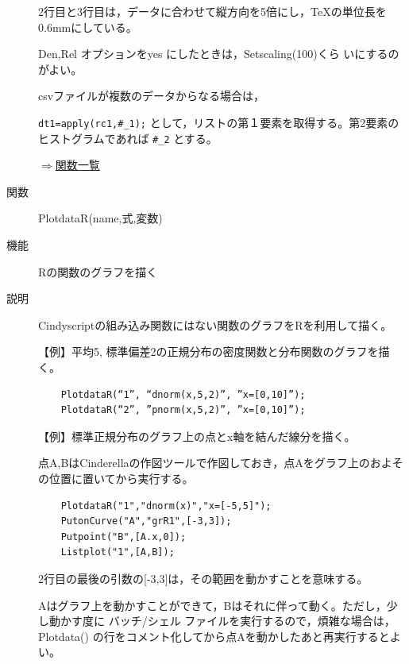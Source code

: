 \documentclass[papersize,a4paper,12pt,uplatex]{jsarticle}
\begin{document}
\begin{description}
2行目と3行目は，データに合わせて縦方向を5倍にし，TeXの単位長を0.6mmにしている。

Den,Rel オプションをyes にしたときは，Setscaling(100)くら  いにするのがよい。

csvファイルが複数のデータからなる場合は，

    \verb|dt1=apply(rc1,#_1);|
として，リストの第１要素を取得する。第2要素のヒストグラムであれば  \verb|#_2| とする。

\vspace{\baselineskip}
\begin{flushright}  \hyperlink{functionlist}{$\Rightarrow$関数一覧}\end{flushright}

\hypertarget{plotdatar}{}
\item[関数]  PlotdataR(name,式,変数)
\item[機能]  Rの関数のグラフを描く
\item[説明]  Cindyscriptの組み込み関数にはない関数のグラフをRを利用して描く。

\vspace{\baselineskip}
【例】平均5, 標準偏差2の正規分布の密度関数と分布関数のグラフを描く。
\begin{verbatim}
    PlotdataR(“1”, “dnorm(x,5,2)”, ”x=[0,10]”);
    PlotdataR(“2”, ”pnorm(x,5,2)”, ”x=[0,10]”);
\end{verbatim}

\hspace{20mm} 

【例】標準正規分布のグラフ上の点とx軸を結んだ線分を描く。

点A,BはCinderellaの作図ツールで作図しておき，点Aをグラフ上のおよその位置に置いてから実行する。
\begin{verbatim}
    PlotdataR("1","dnorm(x)","x=[-5,5]");
    PutonCurve("A","grR1",[-3,3]);
    Putpoint("B",[A.x,0]);
    Listplot("1",[A,B]);
\end{verbatim}
2行目の最後の引数の[-3,3]は，その範囲を動かすことを意味する。

Aはグラフ上を動かすことができて，Bはそれに伴って動く。ただし，少し動かす度に バッチ/シェル ファイルを実行するので，煩雑な場合は，Plotdata() の行をコメント化してから点Aを動かしたあと再実行するとよい。


\end{description}
\end{document}
